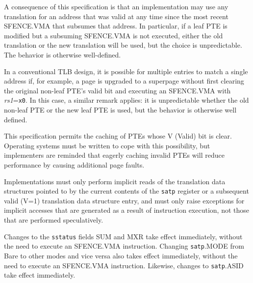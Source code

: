 \begin{commentary}
A consequence of this specification is that an implementation may use any
translation for an address that was valid at any time since the most recent
SFENCE.VMA that subsumes that address.
In particular, if a leaf PTE is modified but a subsuming SFENCE.VMA is not
executed, either the old translation or the new translation will be used, but
the choice is unpredictable.
The behavior is otherwise well-defined.

In a conventional TLB design, it is possible for multiple entries to match a
single address if, for example, a page is upgraded to a superpage without first
clearing the original non-leaf PTE's valid bit and executing an SFENCE.VMA with
{\em rs1}={\tt x0}.
In this case, a similar remark applies: it is unpredictable whether the old
non-leaf PTE or the new leaf PTE is used, but the behavior is otherwise well
defined.
\end{commentary}

\begin{commentary}
This specification permits the caching of PTEs whose V (Valid) bit is clear.
Operating systems must be written to cope with this possibility, but implementers
are reminded that eagerly caching invalid PTEs will reduce performance by causing
additional page faults.
\end{commentary}

Implementations must only perform implicit reads of the translation
data structures pointed to by the current contents of the {\tt satp}
register or a subsequent valid (V=1) translation data structure entry,
and must only raise exceptions for implicit accesses that are
generated as a result of instruction execution, not those that are
performed speculatively.

Changes to the {\tt sstatus} fields SUM and MXR take effect immediately,
without the need to execute an SFENCE.VMA instruction.
Changing {\tt satp}.MODE from Bare to other modes and vice versa also
takes effect immediately, without the need to execute an SFENCE.VMA
instruction.
Likewise, changes to {\tt satp}.ASID take effect immediately.


